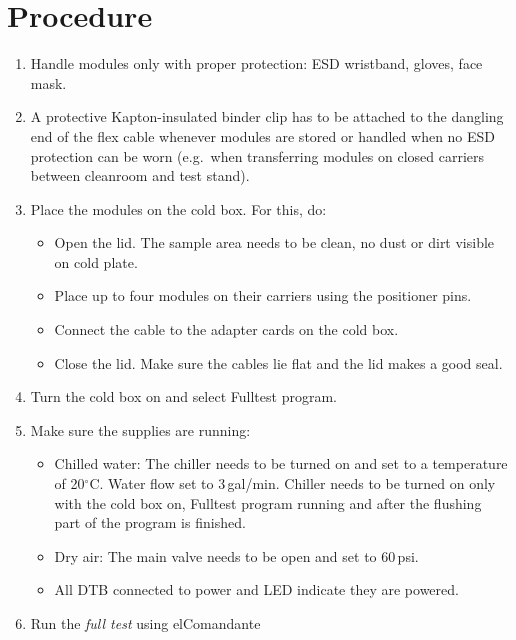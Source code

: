 \documentclass[12pt]{unlsilabsop}
\begin{document}
\section{Procedure}

\begin{enumerate}
    \item Handle modules only with proper protection: ESD wristband, gloves, face mask.
    \item A protective Kapton-insulated binder clip has to be attached to the dangling end of the flex cable whenever modules are stored or handled when no ESD protection can be worn (e.g.~when transferring modules on closed carriers between cleanroom and test stand).
    \item Place the modules on the cold box. For this, do:
    \begin{itemize}
        \item Open the lid. The sample area needs to be clean, no dust or dirt visible on cold plate.
        \item Place up to four modules on their carriers using the positioner pins.
        \item Connect the cable to the adapter cards on the cold box.
        \item Close the lid. Make sure the cables lie flat and the lid makes a good seal.
    \end{itemize}    
    \item Turn the cold box on and select Fulltest program. %
    \item Make sure the supplies are running:
     \begin{itemize}
        \item Chilled water: The chiller needs to be turned on and set to a temperature of 20$^\circ$C. Water flow set to 3\,gal/min. Chiller needs to be turned on only with the cold box on, Fulltest program running and after the flushing part of the program is finished.
        \item Dry air: The main valve needs to be open and set to 60\,psi.
        \item All DTB connected to power and LED indicate they are powered.
    \end{itemize}
    \item Run the \emph{full test} using elComandante 
    \begin{itemize}

\end{itemize}
\end{enumerate}
\end{document}
